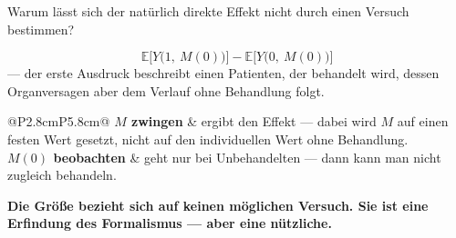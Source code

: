 \begin{aufgabe}
Warum lässt sich der natürlich direkte Effekt nicht durch einen Versuch bestimmen?

\loesung
{}
\[ \mathbb{E}\bigl[Y\bigl(1,\ M(0)\bigr)\bigr] - \mathbb{E}\bigl[Y\bigl(0,\ M(0)\bigr)\bigr] \]
--- der erste Ausdruck beschreibt einen Patienten, der behandelt wird, dessen Organversagen aber dem Verlauf ohne Behandlung folgt.

\begin{center}
{\small
\renewcommand{\arraystretch}{1.5}
\begin{tabular}{@{}P{2.8cm}P{5.8cm}@{}}
\toprule
\textbf{$M$ zwingen} & ergibt den  Effekt --- dabei wird $M$ auf einen festen Wert gesetzt, nicht auf den individuellen Wert ohne Behandlung.\\
\textbf{$M(0)$ beobachten} & geht nur bei Unbehandelten --- dann kann man nicht zugleich behandeln.\\
\bottomrule
\end{tabular}}
\end{center}

\begin{center}
\begin{minipage}{0.9\textwidth}
\textbf{Die Größe bezieht sich auf keinen möglichen Versuch. Sie ist eine Erfindung des Formalismus --- aber eine nützliche.}
\end{minipage}
\end{center}

\begin{center}
\begin{minipage}{0.88\textwidth}
\end{minipage}
\end{center}
\end{aufgabe}

